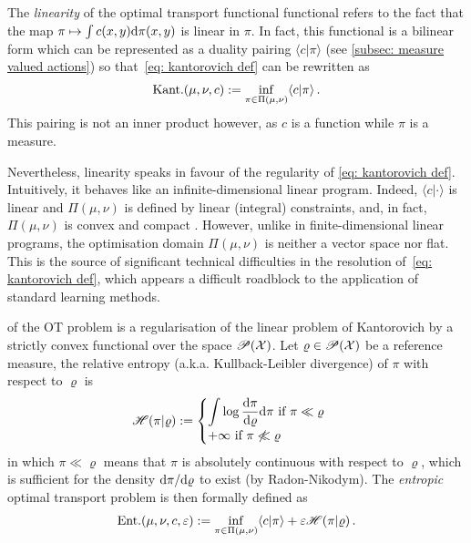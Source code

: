  The \emph{linearity} of the optimal transport functional functional refers to the fact that the map $\pi\mapsto \int c(x,y)\mathrm{d}\pi(x,y)$
is linear in $\pi$. In fact, this functional is a bilinear form which can be represented as a duality pairing $\langle c\vert\pi\rangle$ (see \cref{subsec: measure valued actions}) so that~\eqref{eq: kantorovich def} can be rewritten as
\begin{align}
    \text{Kant.}(\mu,\nu,c):= \inf_{\pi\in\Pi(\mu,\nu)}\langle c\vert\pi\rangle\,.
    \label{eq: kantorovich def 2}
\end{align} 
This pairing is not an inner product however, as $c$ is a function while $\pi$ is a measure. 

Nevertheless, linearity speaks in favour of the regularity of \cref{eq: kantorovich def}. Intuitively, it behaves like an infinite-dimensional linear program. Indeed, $\langle c\vert\cdot\rangle$ is linear and $\Pi(\mu,\nu)$ is defined by linear (integral) constraints, and, in fact, $\Pi(\mu,\nu)$ is convex and compact \citep[Cor.~2.9]{ambrosio_lectures_2021}. However, unlike in finite-dimensional linear programs, the optimisation domain $\Pi(\mu,\nu)$ is neither a vector space nor flat. This is the source of significant technical difficulties in the resolution of~\eqref{eq: kantorovich def}, which appears a difficult roadblock to the application of standard learning methods. 

 of the OT problem is a regularisation of the linear problem of Kantorovich by a strictly convex functional over the space $\mathscr{P}(\mathcal{X})$. Let $\varrho\in\mathscr{P}(\mathcal{X})$ be a reference measure, the relative entropy (a.k.a. Kullback-Leibler divergence) of $\pi$ with respect to $\varrho$ is 
\begin{align}
    \mathscr{H}(\pi\vert\varrho):= \begin{cases} \displaystyle\int \log\frac{\mathrm{d}\pi}{\mathrm{d}\varrho}\mathrm{d}\pi \mbox{ if } \pi\ll\varrho\\ +\infty \mbox{ if } \pi\not\ll\varrho\end{cases}\,\label{eq: def entropy}
\end{align}
in which $\pi\ll\varrho$ means that $\pi$ is absolutely continuous with respect to $\varrho$, which is sufficient for the density $\mathrm{d}\pi/\mathrm{d}\varrho$ to exist (by Radon-Nikodym). 
The \emph{entropic} optimal transport problem is then formally defined as
\begin{align}
    \text{Ent.}(\mu,\nu,c,\varepsilon) := \inf_{\pi\in\Pi(\mu,\nu)} \langle c\vert \pi\rangle + \varepsilon\mathscr{H}(\pi\vert\varrho)\,.\label{eq: entropic OT def}
\end{align}

